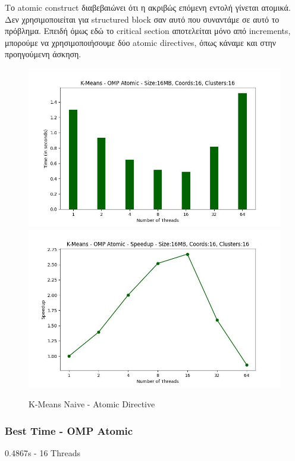 \documentclass[../final_report.tex]{subfiles}
\begin{document}
Το atomic construct διαβεβαιώνει ότι η ακριβώς επόμενη εντολή γίνεται ατομικά. Δεν χρησιμοποιείται για structured block σαν αυτό
που συναντάμε σε αυτό το πρόβλημα. Επειδή όμως εδώ το critical section αποτελείται μόνο από increments, μπορούμε να χρησιμοποιήσουμε 
δύο atomic directives, όπως κάναμε και στην προηγούμενη άσκηση.

\begin{figure}[H]
    \centering
        \includegraphics[scale=0.4]{outFilesAffinityMouliko/plots/kmeans_locks_atomic.jpg}
        \includegraphics[scale=0.4]{outFilesAffinityMouliko/plots/kmeans_locks_atomic_speedup.jpg}
    \caption{K-Means Naive - Atomic Directive}
    \label{fig:K-Means Naive - Atomic Directive}
\end{figure}


\subsubsection*{Best Time - OMP Atomic}
0.4867s - 16 Threads
\end{document}
